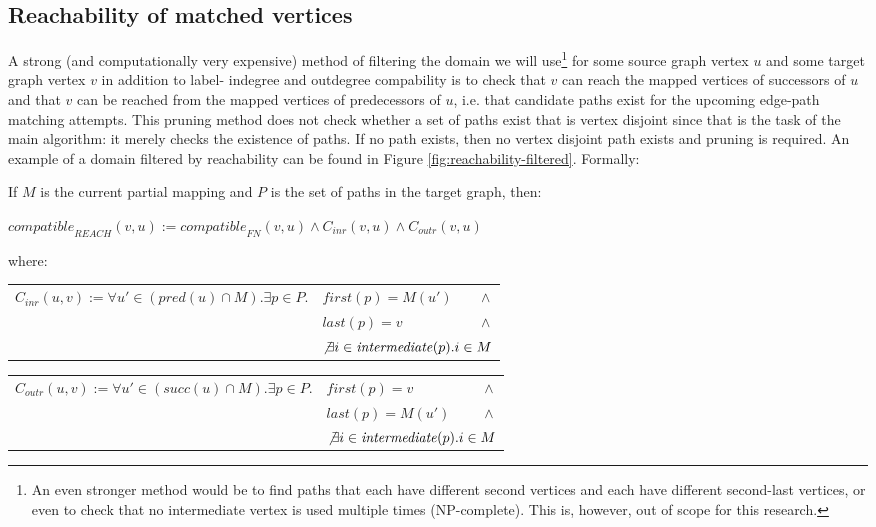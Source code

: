 \subsection{Reachability of matched vertices}
A strong (and computationally very expensive) method of filtering the domain we will use\footnote{An even stronger method would be to find paths that each have different second vertices and each have different second-last vertices, or even to check that no intermediate vertex is used multiple times (NP-complete). This is, however, out of scope for this research.} for some source graph vertex $u$ and some target graph vertex $v$ in addition to label- indegree and outdegree compability is to check that $v$ can reach the mapped vertices of successors of $u$ and that $v$ can be reached from the mapped vertices of predecessors of $u$, i.e. that candidate paths exist for the upcoming edge-path matching attempts. This pruning method does not check whether a set of paths exist that is vertex disjoint since that is the task of the main algorithm: it merely checks the existence of paths. If no path exists, then no vertex disjoint path exists and pruning is required. An example of a domain filtered by reachability can be found in Figure \ref{fig:reachability-filtered}. Formally:


\begin{minipage}{\textwidth}
\begin{defn}

If $M$ is the current partial mapping and $P$ is the set of paths in the target graph, then:

$\mathit{compatible}_{\mathit{REACH}}(v,u) := \mathit{compatible}_{\mathit{FN}}(v,u) \land C_{\mathit{inr}}(v, u) \land C_{\mathit{outr}}(v, u)$

where:

\begin{tabular}{lll}
$C_{\mathit{inr}}(u, v) := \forall u' \in (\mathit{pred}(u) \cap M) .  \exists p \in P .$&$\mathit{first}(p)=M(u')$&$\land$\\
&$\mathit{last}(p)=v$&$\land$\\
&\multicolumn{2}{l}{$\not \exists i \in \mathit{intermediate}(p) . i \in M$}
\end{tabular}

\begin{tabular}{lll}
$C_{\mathit{outr}}(u, v) := \forall u' \in (\mathit{succ}(u) \cap M) .  \exists p \in P .$&$\mathit{first}(p)=v$&$\land$\\
&$\mathit{last}(p)=M(u')$&$\land$\\
&\multicolumn{2}{l}{$\not \exists i \in \mathit{intermediate}(p) . i \in M$}
\end{tabular}
\end{defn}
\end{minipage}




